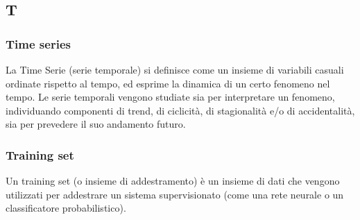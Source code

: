 \subsection*{\textbf{\hfill \Huge{T} \hfill}} 
\subsubsection*{Time series}
La Time Serie (serie temporale) si definisce come un insieme di variabili casuali ordinate rispetto al tempo, ed esprime la dinamica di un certo fenomeno nel tempo. Le serie temporali vengono studiate sia per interpretare un fenomeno, individuando componenti di trend, di ciclicità, di stagionalità e/o di accidentalità, sia per prevedere il suo andamento futuro. 
\subsubsection*{Training set}
Un training set (o insieme di addestramento) è un insieme di dati che vengono utilizzati per addestrare un sistema supervisionato (come una rete neurale o un classificatore probabilistico).
